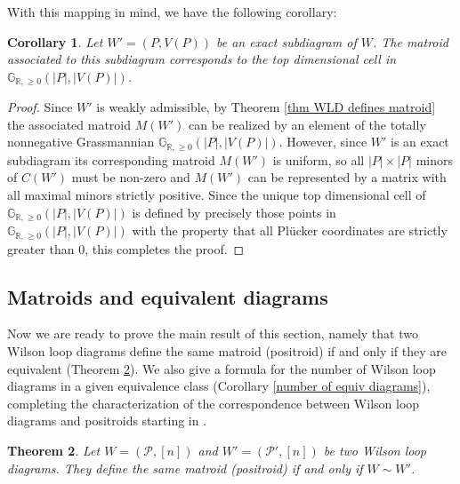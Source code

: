 \documentclass[11pt]{article}
\newcommand{\R}{\mathbb{R}}
\newcommand{\Gr}{\mathbb{G}_{\R, \geq 0}}
\newcommand{\cP}{\mathcal{P}}
\newtheorem{thm}{Theorem}[section]
\newtheorem{cor}[thm]{Corollary}
\theoremstyle{remark}
\theoremstyle{definition}
\begin{document}
With this mapping in mind, we have the following corollary:

\begin{cor}
Let $W' = (P, V(P))$ be an exact subdiagram of $W$. The matroid associated to this subdiagram corresponds to the top dimensional cell in $\Gr(|P|, |V(P)|)$.
\end{cor}

\begin{proof}
Since $W'$ is weakly admissible, by Theorem \ref{thm WLD defines matroid} the associated matroid $M(W')$ can be realized by an element of the totally nonnegative Grassmannian $\Gr(|P|,|V(P)|)$. However, since $W'$ is an exact subdiagram its corresponding matroid $M(W')$ is uniform, so all $|P| \times |P|$ minors of $C(W')$ must be non-zero and $M(W')$ can be represented by a matrix with all maximal minors strictly positive. Since the unique top dimensional cell of $\Gr(|P|, |V(P)|)$ is defined by precisely those points in $\Gr(|P|, |V(P)|)$ with the property that all Pl\"ucker coordinates are strictly greater than $0$, this completes the proof.
\end{proof}


\subsection{Matroids and equivalent diagrams \label{sec: matroids and equivalence}}

Now we are ready to prove the main result of this section, namely that two Wilson loop diagrams define the same matroid (positroid) if and only if they are equivalent (Theorem \ref{same matroid iff equiv}). We also give a formula for the number of Wilson loop diagrams in a given equivalence class (Corollary \ref{number of equiv diagrams}), completing the characterization of the correspondence between Wilson loop diagrams and positroids starting in \cite{wilsonloop}.

\begin{thm}\label{same matroid iff equiv}
Let $W= (\cP, [n])$ and $W'= (\cP', [n])$ be two Wilson loop diagrams. They define the same matroid (positroid) if and only if $W \sim W'$.
\end{thm}
\end{document}
